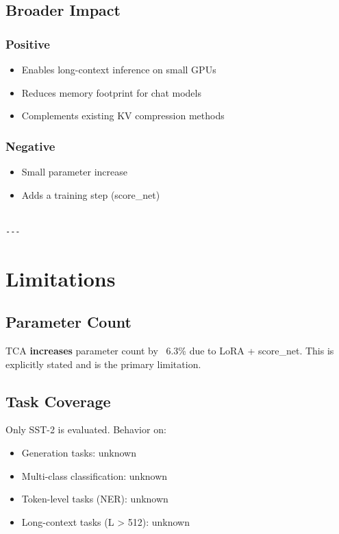 \subsection{Broader Impact}

\subsubsection{Positive}
\begin{itemize}
\item Enables long-context inference on small GPUs
\item Reduces memory footprint for chat models
\item Complements existing KV compression methods

\end{itemize}
\subsubsection{Negative}
\begin{itemize}
\item Small parameter increase
\item Adds a training step (score\_net)
\end{itemize}
\begin{lstlisting}

---
\end{lstlisting}

\section{Limitations}

\subsection{Parameter Count}

TCA \textbf{increases} parameter count by ~6.3\% due to LoRA + score\_net. This is 
explicitly stated and is the primary limitation.

\subsection{Task Coverage}

Only SST-2 is evaluated. Behavior on:
\begin{itemize}
\item Generation tasks: unknown
\item Multi-class classification: unknown
\item Token-level tasks (NER): unknown
\item Long-context tasks (L \textgreater{} 512): unknown

\end{itemize}
